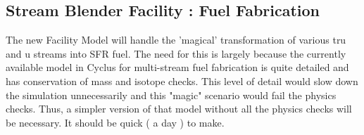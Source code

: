 \subsection{Stream Blender Facility : Fuel Fabrication}

The new Facility Model will handle the 'magical' transformation of various tru
and u streams into SFR fuel. The need for this is largely because the currently
available model in Cyclus for multi-stream fuel fabrication is quite detailed
and has conservation of mass and isotope checks. This level of detail would
slow down the simulation unnecessarily and  this "magic" scenario would fail
the physics checks. Thus, a simpler version of that model without all the
physics checks will be necessary. It should be quick ( a day ) to make.
